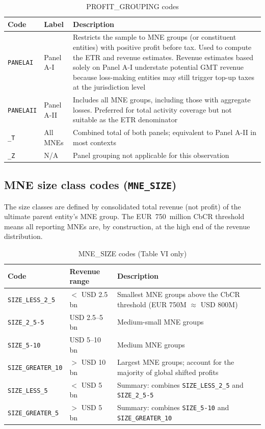 \documentclass[11pt,a4paper]{article}
\newcommand{\code}[1]{\texttt{#1}}
\begin{document}
\begin{table}[H]
\centering
\caption{PROFIT\_GROUPING codes}
\label{tab:panelgroups}
\begin{tabular}{@{}llp{9cm}@{}}
\toprule
Code & Label & Description \\
\midrule
\code{PANELAI} & Panel A-I & Restricts the sample to MNE groups (or constituent entities) with positive profit before tax. Used to compute the ETR and revenue estimates. Revenue estimates based solely on Panel A-I understate potential GMT revenue because loss-making entities may still trigger top-up taxes at the jurisdiction level \\
\code{PANELAII} & Panel A-II & Includes all MNE groups, including those with aggregate losses. Preferred for total activity coverage but not suitable as the ETR denominator \\
\code{\_T} & All MNEs & Combined total of both panels; equivalent to Panel A-II in most contexts \\
\code{\_Z} & N/A & Panel grouping not applicable for this observation \\
\bottomrule
\end{tabular}
\end{table}

\subsection{MNE size class codes (\texttt{MNE\_SIZE})}

The size classes are defined by consolidated total revenue (not profit) of the
ultimate parent entity's MNE group. The EUR~750~million CbCR threshold means all
reporting MNEs are, by construction, at the high end of the revenue distribution.

\begin{table}[H]
\centering
\caption{MNE\_SIZE codes (Table VI only)}
\label{tab:mnesize}
\begin{tabular}{@{}llp{8cm}@{}}
\toprule
Code & Revenue range & Description \\
\midrule
\code{SIZE\_LESS\_2\_5} & $<$ USD 2.5 bn & Smallest MNE groups above the CbCR threshold (EUR 750M $\approx$ USD 800M) \\
\code{SIZE\_2\_5-5} & USD 2.5--5 bn & Medium-small MNE groups \\
\code{SIZE\_5-10} & USD 5--10 bn & Medium MNE groups \\
\code{SIZE\_GREATER\_10} & $>$ USD 10 bn & Largest MNE groups; account for the majority of global shifted profits \\
\code{SIZE\_LESS\_5} & $<$ USD 5 bn & Summary: combines \code{SIZE\_LESS\_2\_5} and \code{SIZE\_2\_5-5} \\
\code{SIZE\_GREATER\_5} & $>$ USD 5 bn & Summary: combines \code{SIZE\_5-10} and \code{SIZE\_GREATER\_10} \\
\bottomrule
\end{tabular}
\end{table}
\end{document}

